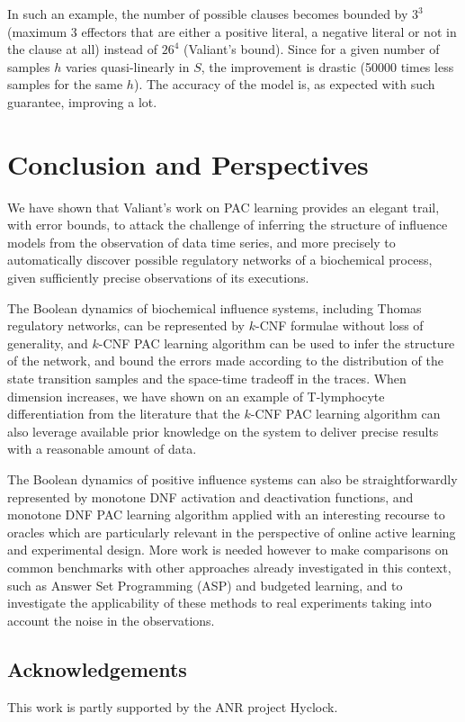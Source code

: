 \documentclass{llncs}
\begin{document}
In such an example, the number of possible clauses becomes bounded by
$3^3$ (maximum 3 effectors that are either a positive literal, a negative
literal or not in the clause at all) instead of $26^4$ (Valiant's bound).
Since for a given number of samples $h$ varies quasi-linearly in $S$, the
improvement is drastic (50000 times less samples for the same $h$). The
accuracy of the model is, as expected with such guarantee, improving a
lot.

\section{Conclusion and Perspectives}

We have shown that Valiant's work on PAC learning provides an elegant trail, with error bounds,
to attack the challenge of inferring the structure of influence models from the observation of data time series,
and more precisely to automatically discover possible regulatory networks of a biochemical process, given sufficiently precise observations of its executions.

The Boolean dynamics of biochemical influence systems, including Thomas regulatory networks, can be represented by $k$-CNF formulae without loss of generality,
and $k$-CNF PAC learning algorithm can be used to infer the structure of the network,
and bound the errors made according to the distribution of the state transition samples and the space-time tradeoff in the traces.
When dimension increases, we have shown on an example of T-lymphocyte differentiation from the literature
that the $k$-CNF PAC learning algorithm can also leverage available
prior knowledge on the system to deliver precise results with a reasonable
amount of data.

The Boolean dynamics of positive influence systems can also be straightforwardly represented by monotone DNF activation and deactivation functions,
and monotone DNF PAC learning algorithm applied with an interesting recourse to oracles 
which are particularly relevant in the perspective of online active learning and experimental design.
More work is needed however to make comparisons on common benchmarks
with  other approaches already investigated in this context, such as Answer Set Programming (ASP) and budgeted learning,
and to investigate the applicability of these methods to real experiments taking into account the noise in the observations.

\subsection*{Acknowledgements}

This work is partly supported by the ANR project Hyclock.



\end{document}
